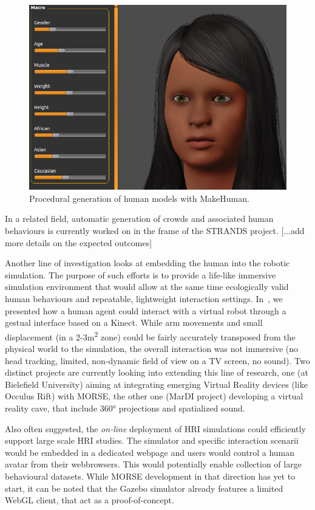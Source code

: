 \documentclass[conference]{IEEEtran}
\begin{document}
\begin{figure}[tb]
  \centering
  \includegraphics[width=.9\columnwidth]{figs/makehuman.png}
  \caption{Procedural generation of human models with {\sc MakeHuman}.}
  \label{fig:makehuman}
\end{figure}

In a related field, automatic generation of crowds and associated human
behaviours is currently worked on in the frame of the STRANDS project.
[...add more details on the expected outcomes]

Another line of investigation looks at embedding the human into the robotic
simulation. The purpose of such efforts is to provide a life-like immersive
simulation environment that would allow at the same time ecologically valid
human behaviours and repeatable, lightweight interaction settings.
In~\cite{lemaignan2012morse}, we presented how a human agent could interact with
a virtual robot through a gestual interface based on a Kinect. While arm
movements and small displacement (in a 2-3m\textsuperscript{2} zone) could be fairly
accurately transposed from the physical world to the simulation, the overall
interaction was not immersive (no head tracking, limited, non-dynamic field of
view on a TV screen, no sound). Two distinct projects are currently looking into
extending this line of research, one (at Bielefield University) aiming at
integrating emerging Virtual Reality devices (like Occulus Rift) with MORSE, the
other one (MarDI project) developing a virtual reality cave, that include 360°
projections and spatialized sound.

Also often suggested, the \emph{on-line} deployment of HRI simulations could
efficiently support large scale HRI studies. The simulator and specific
interaction scenarii would be embedded in a dedicated webpage and users would
control a human avatar from their webbrowsers. This would potentially enable
collection of large behavioural datasets. While MORSE development in that
direction has yet to start, it can be noted that the Gazebo simulator already
features a limited WebGL client, that act as a proof-of-concept.
\end{document}
